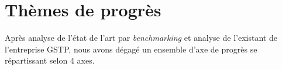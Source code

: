 \section{Thèmes de progrès}

Après analyse de l'état de l'art par {\sl benchmarking} et analyse de l'existant
de l'entreprise GSTP, nous avons dégagé un ensemble d'axe de progrès se 
répartissant selon 4 axes.
